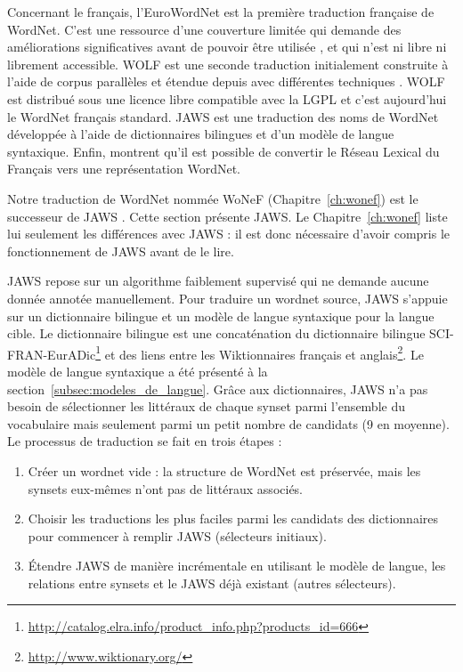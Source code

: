 Concernant le français, l'EuroWordNet \citep{vossen1998eurowordnet} est la
première traduction française de WordNet. C'est une ressource d'une couverture
limitée qui demande des améliorations significatives avant de pouvoir être
utilisée \citep{jacquin2006systemes}, et qui n'est ni libre ni librement
accessible. WOLF est une seconde traduction initialement construite à l'aide de
corpus parallèles \citep{sagot2008construction} et étendue depuis avec
différentes techniques \citep{apidianaki2012applying}. WOLF est distribué sous
une licence libre compatible avec la LGPL et c'est aujourd'hui le WordNet
français standard. JAWS \citep{mouton2010jaws} est une traduction des noms de
WordNet développée à l'aide de dictionnaires bilingues et d'un modèle de langue
syntaxique. Enfin, \cite{gader2014lexicon} montrent qu'il est possible de
convertir le Réseau Lexical du Français vers une représentation WordNet.


\label{subsec:jaws_translation_process}

Notre traduction de WordNet nommée WoNeF (Chapitre~\ref{ch:wonef}) est le
successeur de JAWS \citep{mouton2010jaws,mouton2010phd}. Cette section présente
JAWS. Le Chapitre~\ref{ch:wonef} liste lui seulement les différences avec JAWS
: il est donc nécessaire d'avoir compris le fonctionnement de JAWS avant de le
lire.

JAWS repose sur un algorithme faiblement supervisé qui ne demande aucune donnée
annotée manuellement. Pour traduire un wordnet source, JAWS s'appuie sur un
dictionnaire bilingue et un modèle de langue syntaxique pour la langue cible.
Le dictionnaire bilingue est une concaténation du dictionnaire bilingue
SCI-FRAN-EurADic\footnote{\url{http://catalog.elra.info/product_info.php?products_id=666}}
et des liens entre les Wiktionnaires français et
anglais\footnote{\url{http://www.wiktionary.org/}}. Le modèle de langue
syntaxique a été présenté à la section~\ref{subsec:modeles_de_langue}. Grâce
aux dictionnaires, JAWS n'a pas besoin de sélectionner les littéraux de chaque
synset parmi l'ensemble du vocabulaire mais seulement parmi un petit nombre de
candidats (9 en moyenne).  Le processus de traduction se fait en trois étapes :

\begin{enumerate}
    \item Créer un wordnet vide : la structure de WordNet est préservée, mais
        les synsets eux-mêmes n'ont pas de littéraux associés.
    \item Choisir les traductions les plus faciles parmi les candidats des
        dictionnaires pour commencer à remplir JAWS (sélecteurs initiaux).
    \item Étendre JAWS de manière incrémentale en utilisant le modèle de
        langue, les relations entre synsets et le JAWS déjà existant (autres
        sélecteurs).
\end{enumerate}


